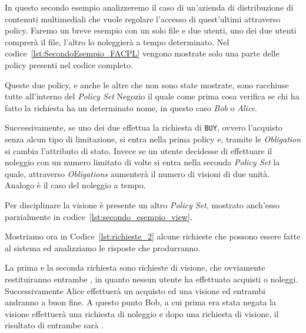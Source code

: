 In questo secondo esempio analizzeremo il caso di un'azienda di distribuzione di contenuti multimediali che vuole regolare l'accesso di quest'ultimi attraverso policy.
Faremo un breve esempio con un solo file e due utenti, uno dei due utenti comprerà il file, l'altro lo noleggierà a tempo determinato.
Nel codice~\ref{lst:SecondoEsempio_FACPL} vengono mostrate solo una parte delle policy presenti nel codice completo.

Queste due policy, e anche le altre che non sono state mostrate, sono racchiuse tutte all'interno del \textit{Policy Set} Negozio il quale come prima cosa verifica se chi ha fatto la richiesta ha un determinato nome, in questo caso \textit{Bob} o \textit{Alice}.\\ \par
Successivamente, se uno dei due effettua la richiesta di \texttt{BUY}, ovvero l'acquisto senza alcun tipo di limitazione, si entra nella prima policy e, tramite le \textit{Obligation} si cambia l'attributo di stato. Invece se un utente decidesse di effettuare il noleggio con un numero limitato di volte si entra nella seconda \textit{Policy Set} la quale, attraverso \textit{Obligations} aumenterà il numero di visioni di due unità. Analogo è il caso del noleggio a tempo.\\ \par
Per disciplinare la visione è presente un altro \textit{Policy Set}, mostrato anch'esso parzialmente in codice~\ref{lst:secondo_esempio_view}.

Mostriamo ora in Codice~\ref{lst:richieste_2} alcune richieste che possono essere fatte al sistema ed analizziamo le risposte che produrranno.

La prima e la seconda richiesta sono richieste di visione, che ovviamente restituiranno entrambe \deny, in quanto nessun utente ha effettuato acquisti o noleggi.
Successivamente Alice effettuerà un acquisto ed una visione ed entrambi andranno a buon fine. A questo punto Bob, a cui prima era stata negata la visione effettuerà una richiesta di noleggio e dopo una richiesta di visione, il risultato di entrambe sarà \permit.

